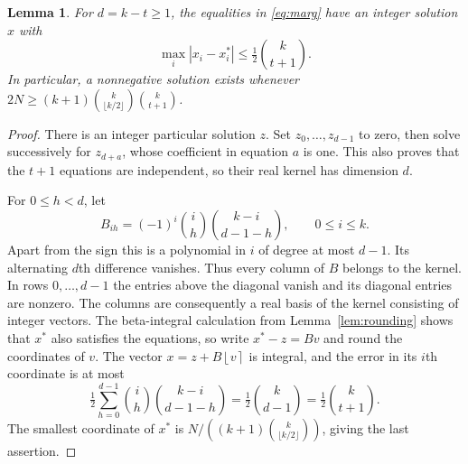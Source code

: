 \documentclass[11pt]{article}
\newtheorem{lemma}[theorem]{Lemma}
\newcommand{\nint}[1]{\left\lfloor #1\right\rceil}
\begin{document}
\begin{lemma}\label{lem:lattice}
For $d=k-t\ge1$, the equalities in \eqref{eq:marg} have an integer
solution $x$ with
\[
 \max_i |x_i-x_i^*| \le \tfrac12\binom{k}{t+1}.
\]
In particular, a nonnegative solution exists whenever
$2N\ge(k+1)\binom{k}{\lfloor k/2\rfloor}\binom{k}{t+1}$.
\end{lemma}
\begin{proof}
There is an integer particular solution $z$. Set $z_0,\ldots,z_{d-1}$
to zero, then solve successively for $z_{d+a}$, whose coefficient
in equation $a$ is one. This also proves that the $t+1$ equations are
independent, so their real kernel has dimension $d$.

For $0\le h<d$, let
\[
 B_{ih}=(-1)^i\binom{i}{h}\binom{k-i}{d-1-h},
 \qquad 0\le i\le k .
\]
Apart from the sign this is a polynomial in $i$ of degree at most
$d-1$. Its alternating $d$th difference vanishes. Thus every column of
$B$ belongs to the kernel. In rows $0,\ldots,d-1$ the entries above
the diagonal vanish and its diagonal entries are nonzero. The columns
are consequently a real basis of the kernel consisting of integer vectors.
The beta-integral calculation from Lemma~\ref{lem:rounding} shows that
\(x^*\) also satisfies the equations, so write $x^*-z=Bv$ and round
the coordinates of $v$. The vector $x=z+B\nint v$ is integral, and the
error in its $i$th coordinate is at most
\[
 \tfrac12\sum_{h=0}^{d-1}\binom{i}{h}\binom{k-i}{d-1-h}
 =\tfrac12\binom{k}{d-1}=\tfrac12\binom{k}{t+1}.
\]
The smallest coordinate of $x^*$ is
$N/((k+1)\binom{k}{\lfloor k/2\rfloor})$, giving the last assertion.
\end{proof}
\end{document}
